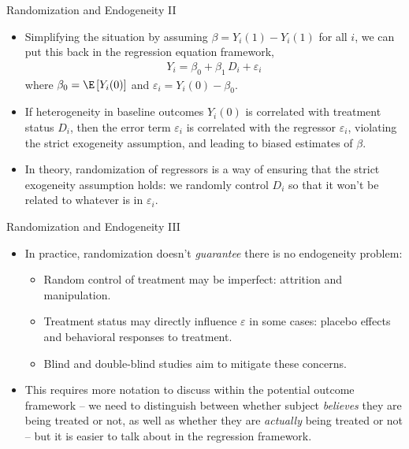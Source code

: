\documentclass[aspectratio=169,11pt]{beamer}
\begin{document}
\begin{frame}{Randomization and Endogeneity II}
\begin{itemize}
  \item Simplifying the situation by assuming $\beta=Y_{i}(1)-Y_{i}(1)$ for all
$i$, we can put this back in the regression equation framework,
\begin{align*}
Y_{i}=\beta_{0}+\beta_{1}\, D_{i}+\varepsilon_{i}
\end{align*}
where $\beta_{0}=\E\left[Y_{i}(0)\right]$ and $\varepsilon_{i}=Y_{i}(0)-\beta_{0}$.

  \medskip
  \item If heterogeneity in baseline outcomes  $Y_{i}(0)$  is correlated with treatment status $D_i$,
  then the error term $\varepsilon_{i}$ is correlated with the regressor $\varepsilon_i$,
  violating the strict exogeneity assumption, and leading to biased estimates of $\beta$.

  \medskip
  \item In theory, randomization of regressors is a way of ensuring that the strict exogeneity assumption holds:
  we randomly control $D_i$ so that it won't be related to whatever is in $\varepsilon_i$.
\end{itemize}
\end{frame}

\begin{frame}{Randomization and Endogeneity III}
\begin{itemize}
  \item In practice, randomization doesn't \emph{guarantee} there is no endogeneity problem:
  \begin{itemize}
    \item Random control of treatment may be imperfect: attrition and manipulation.
    \item Treatment status may directly influence $\varepsilon$ in some cases: placebo effects 
      and behavioral responses to treatment. 
    \item Blind and double-blind studies aim to mitigate these concerns.
  \end{itemize}
    
\medskip
  \item This requires more notation to discuss within the potential outcome framework -- we need to distinguish
  between whether subject \emph{believes} they are being treated or not, as well as whether they are \emph{actually}
  being treated or not -- but it is easier to talk about in the regression framework. 
\end{itemize}
\end{frame}
\end{document}
